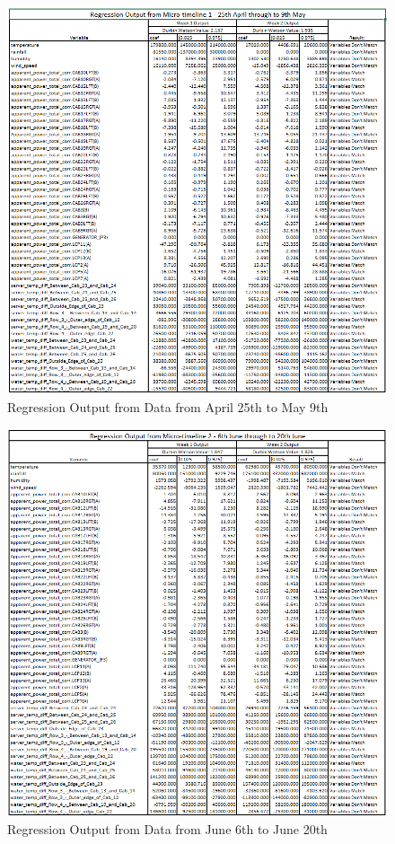 \documentclass[12pt]{scrartcl}
\begin{document}
\begin{figure}[H]
  \caption{Regression Output from Data from April 25th to May 9th}
  \label{fig:regressionresultsweek1}
  \centering
    \includegraphics[scale=0.75]{regressionweek1}
\end{figure} 

\begin{figure}[H]
  \caption{Regression Output from Data from June 6th to June 20th}
  \label{fig:regressionresultsweek2}
  \centering
    \includegraphics[scale=0.75]{regressionweek2}
\end{figure} 
\end{document}
